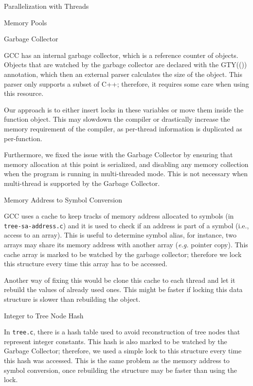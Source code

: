 \begin{section}{Parallelization with Threads}
\begin{subsection}{Memory Pools}
\end{subsection}

\begin{subsection}{Garbage Collector}

GCC has an internal garbage collector, which is a reference counter of objects.
Objects that are watched by the garbage collector are declared with the GTY(())
annotation, which then an external parser calculates the size of the object.
This parser only supports a subset of C++; therefore, it requires some care
when using this resource.

Our approach is to either insert locks in
these variables or move them inside the function object. This may slowdown 
the compiler or drastically increase the memory requirement of the compiler,
as per-thread information is duplicated as per-function.

Furthermore, we fixed the issue with the Garbage Collector by ensuring that
memory allocation at this point is serialized, and disabling any memory
collection when the program is running in multi-threaded mode. This is not
necessary when multi-thread is supported by the Garbage Collector.

\end{subsection}

\begin{subsection}{Memory Address to Symbol Conversion}

GCC uses a cache to keep tracks of memory address allocated to symbols (in
\texttt{tree-sa-address.c}) and it is used to check if an address is part of a symbol
(i.e., access to an array). This is useful to determine symbol alias, for instance,
two arrays may share its memory address with another array (\textit{e.g.} pointer
copy).
This cache array is marked to be watched by the
garbage collector; therefore we lock this structure every time this array has
to be accessed.

Another way of fixing this would be clone this cache to each thread and
let it rebuild the values of already used ones. This might be faster if
locking this data structure is slower than rebuilding the object.

\end{subsection}

\begin{subsection}{Integer to Tree Node Hash}

In \texttt{tree.c}, there is a hash table used to avoid reconstruction of tree nodes
that represent integer constants. This hash is also marked to be watched by the
Garbage Collector; therefore, we used a simple lock to this structure every
time this hash was accessed. This is the same problem as the memory address to
symbol conversion, once rebuilding the structure may be faster than using the
lock.


\end{subsection}
\end{section}
